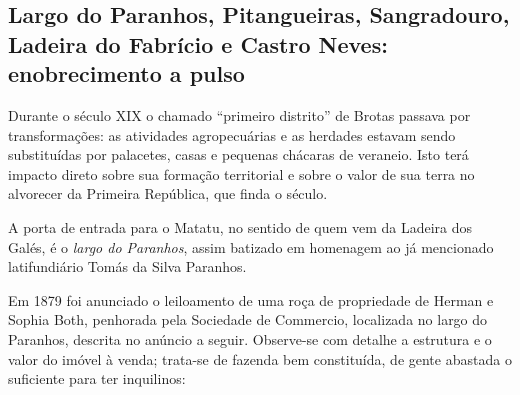 \subsection{Largo do Paranhos, Pitangueiras, Sangradouro, Ladeira do Fabrício e Castro Neves: enobrecimento a pulso}\label{subsec:pitangueiras}

Durante o século XIX o chamado ``primeiro distrito'' de Brotas passava por transformações: as atividades agropecuárias e as herdades estavam sendo substituídas por palacetes, casas e pequenas chácaras de veraneio. Isto terá impacto direto sobre sua formação territorial e sobre o valor de sua terra no alvorecer da Primeira República, que finda o século.

A porta de entrada para o Matatu, no sentido de quem vem da Ladeira dos Galés, é o \textit{largo do Paranhos}, assim batizado em homenagem ao já mencionado latifundiário Tomás da Silva Paranhos.

Em 1879 foi anunciado o leiloamento de uma roça de propriedade de Herman e Sophia Both, penhorada pela Sociedade de Commercio, localizada no largo do Paranhos, descrita no anúncio a seguir. Observe-se com detalhe a estrutura e o valor do imóvel à venda; trata-se de fazenda bem constituída, de gente abastada o suficiente para ter inquilinos:

